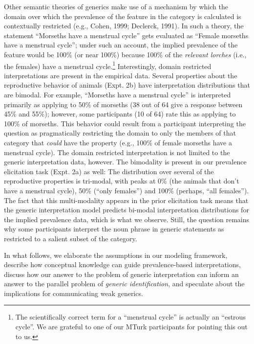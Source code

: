 \documentclass[,man,floatsintext]{apa6}
\let\rmarkdownfootnote\footnote%
\def\footnote{\protect\rmarkdownfootnote}
\theoremstyle{definition}
\theoremstyle{definition}
\theoremstyle{definition}
\theoremstyle{remark}
\begin{document}
Other semantic theories of generics make use of a mechanism by which the
domain over which the prevalence of the feature in the category is
calculated is contextually restricted (e.g., Cohen, 1999; Declerck,
1991). In such a theory, the statement \enquote{Morseths have a
menstrual cycle} gets evaluated as \enquote{Female morseths have a
menstrual cycle}; under such an account, the implied prevalence of the
feature would be 100\% (or near 100\%) because 100\% of the
\emph{relevant lorches} (i.e., the females) have a menstrual
cycle.\footnote{The scientifically correct term for a \enquote{menstrual
  cycle} is actually an \enquote{estrous cycle}. We are grateful to one
  of our MTurk participants for pointing this out to us. }
Interestingly, domain restricted interpretations are present in the
empirical data. Several properties about the reproductive behavior of
animals (Expt. 2b) have interpretation distributions that are bimodal.
For example, \enquote{Morseths have a menstrual cycle} is interpreted
primarily as applying to 50\% of morseths (38 out of 64 give a response
between 45\% and 55\%); however, some participants (10 of 64) rate this
as applying to 100\% of morseths. This behavior could result from a
participant interpreting the question as pragmatically restricting the
domain to only the members of that category that \emph{could} have the
property (e.g., 100\% of female morseths have a menstrual cycle). The
domain restricted interpretation is not limited to the generic
interpretation data, however. The bimodality is present in our
prevalence elicitation task (Expt. 2a) as well: The distribution over
several of the reproductive properties is tri-modal, with peaks at 0\%
(the animals that don't have a menstrual cycle), 50\% (\enquote{only
females}) and 100\% (perhaps, \enquote{all females}). The fact that this
multi-modality appears in the prior elicitation task means that the
generic interpretation model predicts bi-modal interpretation
distributions for the implied prevalence data, which is what we observe.
Still, the question remains why some participants interpret the noun
phrase in generic statements as restricted to a salient subset of the
category.

In what follows, we elaborate the assumptions in our modeling framework,
describe how conceptual knowledge can guide prevalence-based
interpretations, discuss how our answer to the problem of generic
interpretation can inform an answer to the parallel problem of
\emph{generic identification}, and speculate about the implications for
communicating weak generics.
\end{document}
